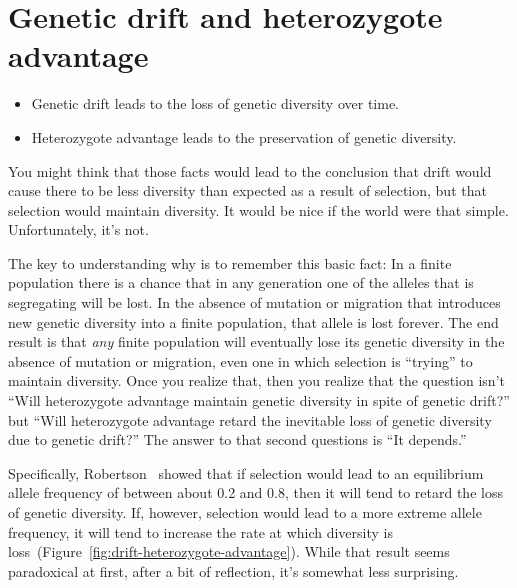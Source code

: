\documentclass[12pt]{article}
\begin{document}
\section*{Genetic drift and heterozygote advantage}

\begin{itemize}

\item Genetic drift leads to the loss of genetic diversity over time. 

\item Heterozygote advantage leads to the preservation of genetic diversity.

\end{itemize}

You might think that those facts would lead to the conclusion that
drift would cause there to be less diversity than expected as a result
of selection, but that selection would maintain diversity. It would be
nice if the world were that simple. Unfortunately, it's not. 

The key to understanding why is to remember this basic fact: In a
finite population there is a chance that in any generation one of the
alleles that is segregating will be lost. In the absence of mutation
or migration that introduces new genetic diversity into a finite
population, that allele is lost forever. The end result is that {\it
  any\/} finite population will eventually lose its genetic diversity
in the absence of mutation or migration, even one in which selection
is ``trying'' to maintain diversity. Once you realize that, then you
realize that the question isn't ``Will heterozygote advantage maintain
genetic diversity in spite of genetic drift?'' but ``Will heterozygote
advantage retard the inevitable loss of genetic diversity due to
genetic drift?'' The answer to that second questions is ``It depends.''

Specifically, Robertson~\cite{Robertson-1962} showed that if selection
would lead to an equilibrium allele frequency of between about 0.2 and
0.8, then it will tend to retard the loss of genetic diversity. If,
however, selection would lead to a more extreme allele frequency, it
will tend to increase the rate at which diversity is
loss~(Figure~\ref{fig:drift-heterozygote-advantage}). While that
result seems paradoxical at first, after a bit of reflection, it's
somewhat less surprising.
\end{document}
